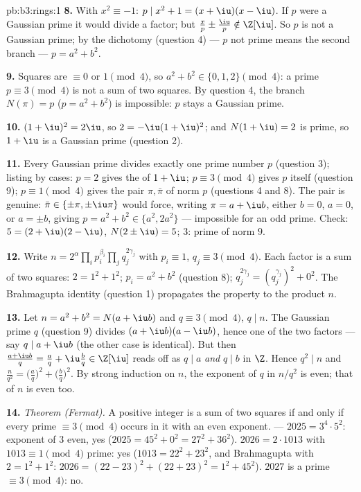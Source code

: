 \begin{solution}{pb:b3:rings:1}
\textbf{8.} With $x^2 \equiv -1$: $p \mid x^2 + 1 = (x + \iu)(x -
\iu)$. If $p$ were a Gaussian prime it would divide a factor; but
$\frac xp \pm \frac \iu p \notin \Z[\iu]$. So $p$ is not a
Gaussian prime; by the dichotomy (question 4) --- $p$ not prime
means the second branch --- $p = a^2 + b^2$.

\textbf{9.} Squares are $\equiv 0$ or $1 \pmod 4$, so $a^2 + b^2
\in \{0, 1, 2\} \pmod 4$: a prime $p \equiv 3 \pmod 4$ is not a
sum of two squares. By question 4, the branch $N(\pi) = p$ ($p =
a^2+b^2$) is impossible: $p$ stays a Gaussian prime.

\textbf{10.} $(1 + \iu)^2 = 2\iu$, so $2 = -\iu(1 + \iu)^2$; and
$N(1 + \iu) = 2$ is prime, so $1 + \iu$ is a Gaussian prime
(question 2).

\textbf{11.} Every Gaussian prime divides exactly one prime
number $p$ (question 3); listing by cases: $p = 2$ gives the
 of $1 + \iu$; $p \equiv 3 \pmod 4$ gives $p$ itself
(question 9); $p \equiv 1 \pmod 4$ gives the pair $\pi, \bar\pi$
of norm $p$ (questions 4 and 8). The pair is genuine: $\bar\pi \in
\{\pm\pi, \pm\iu\pi\}$ would force, writing $\pi = a + \iu b$,
either $b = 0$, $a = 0$, or $a = \pm b$, giving $p = a^2 + b^2 \in
\{a^2, 2a^2\}$ --- impossible for an odd prime. Check:
$5 = (2 + \iu)(2 - \iu)$, $N(2\pm\iu) = 5$; $3$: prime of norm
$9$.

\textbf{12.} Write $n = 2^{\alpha}\prod_i p_i^{\beta_i} \prod_j
q_j^{2\gamma_j}$ with $p_i \equiv 1$, $q_j \equiv 3 \pmod 4$.
Each factor is a sum of two squares: $2 = 1^2 + 1^2$; $p_i = a^2
+ b^2$ (question 8); $q_j^{2\gamma_j} = (q_j^{\gamma_j})^2 +
0^2$. The Brahmagupta identity (question 1) propagates the
property to the product $n$.

\textbf{13.} Let $n = a^2 + b^2 = N(a + \iu b)$ and $q \equiv 3
\pmod 4$, $q \mid n$. The Gaussian prime $q$ (question 9) divides
$(a + \iu b)(a - \iu b)$, hence one of the two factors --- say $q
\mid a + \iu b$ (the other case is identical). But then $\frac{a +
\iu b}{q} = \frac aq + \iu \frac bq \in \Z[\iu]$ reads off as $q
\mid a$ \emph{and} $q \mid b$ in $\Z$. Hence $q^2 \mid n$ and
$\frac n{q^2} =
\bigl(\frac aq\bigr)^2 + \bigl(\frac bq\bigr)^2$. By strong
induction on $n$, the exponent of $q$ in $n/q^2$ is even; that of
$n$ is even too.

\textbf{14.} \emph{Theorem (Fermat).} A positive integer is a sum
of two squares if and only if every prime $\equiv 3 \pmod 4$
occurs in it with an even exponent. --- $2025 = 3^4 \cdot 5^2$:
exponent of $3$ even, yes ($2025 = 45^2 + 0^2 = 27^2 + 36^2$).
$2026 = 2 \cdot 1013$ with $1013 \equiv 1 \pmod 4$ prime: yes
($1013 = 22^2 + 23^2$, and Brahmagupta with $2 = 1^2+1^2$:
$2026 = (22 - 23)^2 + (22 + 23)^2 = 1^2 + 45^2$). $2027$ is a
prime $\equiv 3 \pmod 4$: no.


\end{solution}
